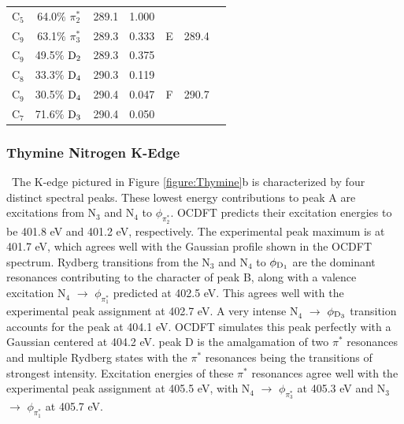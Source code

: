 \documentclass[12pt]{article}
\begin{document}
\begin{table}[!t]
\begin{tabular*}{8.5cm}{@{\extracolsep{\fill} }cccrccc}
    C$_5$
 &   64.0$\%$ $\pi_2^*$  & 289.1 & 1.000 & \multirow{3}{*}{E} & \multirow{3}{*}{289.4} \\
    C$_9$
 &   63.1$\%$ $\pi_3^*$  & 289.3 & 0.333 \\
    C$_9$
 &   49.5$\%$ $\rm D_2$  & 289.3 & 0.375 
 \vspace{0.05in}\\
    C$_8$
 &   33.3$\%$ $\rm D_4$  & 290.3 & 0.119 & \multirow{3}{*}{F} &  \multirow{3}{*}{290.7}  \\
    C$_9$
 &   30.5$\%$ $\rm D_4$  & 290.4 & 0.047 \\
    C$_7$
 &   71.6$\%$ $\rm D_3$  & 290.4 & 0.050 \\
\hline\hline%
   \end{tabular*}
   \label{table: thymine_k_oxygen}
   \end{table}
\subsubsection{Thymine Nitrogen K-Edge} \ The K-edge pictured in Figure \ref{figure:Thymine}b is characterized by four distinct spectral peaks. These lowest energy contributions to peak A are excitations from N$_3$ and N$_4$ to $\phi_{\pi^*_2}$. OCDFT predicts their excitation energies to be 401.8 eV and 401.2 eV, respectively. The experimental peak maximum is at 401.7 eV, which agrees well with the Gaussian profile shown in the OCDFT spectrum. Rydberg transitions from the N$_3$ and N$_4$ to $\phi_{\rm D_1}$ are the dominant resonances contributing to the character of peak B, along with a valence excitation N$_4$ $\rightarrow$ $\phi_{\pi^*_1}$ predicted at 402.5 eV. This agrees well with the experimental peak assignment at 402.7 eV. A very intense N$_4$ $\rightarrow$ $\phi_{\rm D_3}$ transition accounts for the peak at 404.1 eV. OCDFT simulates this peak perfectly with a Gaussian centered at 404.2 eV. peak D is the amalgamation of two $\pi^*$ resonances and multiple Rydberg states with the $\pi^*$ resonances being the transitions of strongest intensity. Excitation energies of these $\pi^*$ resonances agree well with the experimental peak assignment at 405.5 eV, with N$_4$ $\rightarrow$ $\phi_{\pi^*_3}$ at 405.3 eV and N$_3$ $\rightarrow$ $\phi_{\pi^*_1}$ at 405.7 eV.
\end{document}
